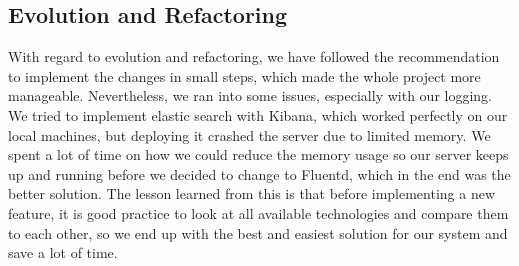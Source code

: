 \subsection{Evolution and Refactoring}

With regard to evolution and refactoring, we have followed the recommendation to implement the changes in small steps, which made the whole project more manageable. 
Nevertheless, we ran into some issues, especially with our logging. We tried to implement elastic search with Kibana, which worked perfectly on our local machines, 
but deploying it crashed the server due to limited memory. We spent a lot of time on how we could reduce the memory usage so our server keeps up and running 
before we decided to change to Fluentd, which in the end was the better solution. The lesson learned from this is that before implementing a new feature, 
it is good practice to look at all available technologies and compare them to each other, so we end up with the best and easiest solution for our system and save a lot of time. 
